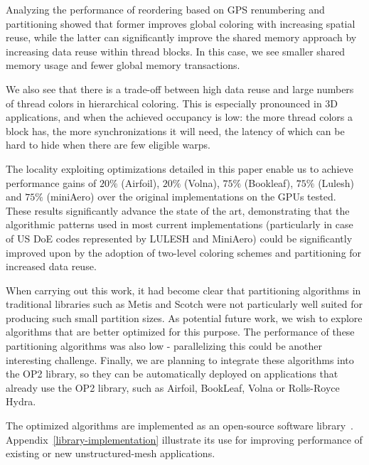 \documentclass[number]{elsarticle}
\begin{document}
Analyzing the performance of reordering based on GPS renumbering and 
partitioning showed that former improves global coloring with increasing 
spatial reuse, while the latter can significantly improve the shared memory 
approach by increasing data reuse within thread blocks. In this case, we 
see smaller shared memory usage and fewer global memory transactions.

We also see that there is a trade-off between high data reuse and large numbers 
of thread colors in hierarchical coloring. This is especially pronounced in 3D 
applications, and when the achieved occupancy is low: the more thread colors a 
block has, the more synchronizations it will need, the latency of which can be 
hard to hide when there are few eligible warps.

The locality exploiting optimizations detailed in this paper enable us to 
achieve performance gains of $20\%$ (Airfoil), $20\%$ (Volna), $75\%$ 
(Bookleaf), $75\%$ (Lulesh) and $75\%$ (miniAero) over the original 
implementations on the GPUs tested. These results significantly advance the 
state of the art, demonstrating that the algorithmic patterns used in most 
current implementations (particularly in case of US DoE codes represented by 
LULESH and MiniAero) could be significantly improved upon by the adoption of 
two-level coloring schemes and partitioning for increased data reuse.

When carrying out this work, it had become clear that partitioning algorithms in
traditional libraries such as Metis and Scotch were not particularly well suited
for producing such small partition sizes. As potential future work, we wish to
explore algorithms that are better optimized for this purpose. The performance
of these partitioning algorithms was also low - parallelizing this could be
another interesting challenge. Finally, we are planning to integrate these
algorithms into the OP2 library, so they can be automatically deployed on
applications that already use the OP2 library, such as Airfoil, BookLeaf, Volna
or Rolls-Royce Hydra.

The optimized algorithms are implemented as an open-source software 
library~\cite{opt-library}. Appendix~\ref{library-implementation} illustrate its 
use for improving performance of existing or new unstructured-mesh applications.
\end{document}

